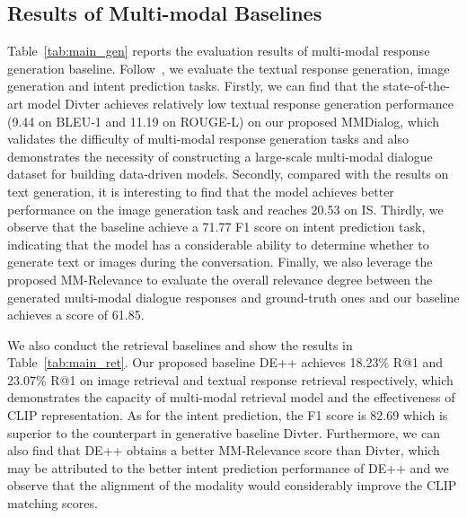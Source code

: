 \documentclass[11pt]{article}
\newcommand{\DataName}{MMDialog}
\begin{document}
\subsection{Results of Multi-modal Baselines}
Table~\ref{tab:main_gen} reports the evaluation results of multi-modal response generation baseline. Follow~\citet{sun-etal-2022-multimodal}, we evaluate the textual response generation, image generation and intent prediction tasks. Firstly, we can find that the state-of-the-art model Divter achieves relatively low textual response generation performance (9.44 on BLEU-1 and 11.19 on ROUGE-L) on our proposed \DataName, which validates the difficulty of multi-modal response generation tasks and also demonstrates the necessity of constructing a large-scale multi-modal dialogue dataset for building data-driven models. Secondly, compared with the results on text generation, it is interesting to find that the model achieves better performance on the image generation task and reaches 20.53 on IS. Thirdly, we observe that the baseline achieve a 71.77 F1 score on intent prediction task, indicating that the model has a considerable ability to determine whether to generate text or images during the conversation. Finally, we also leverage the proposed MM-Relevance to evaluate the overall relevance degree between the generated multi-modal dialogue responses and ground-truth ones and our baseline achieves a score of 61.85.

We also conduct the retrieval baselines and show the results in Table~\ref{tab:main_ret}. Our proposed baseline DE++ achieves 18.23\% R@1 and 23.07\% R@1 on image retrieval and textual response retrieval respectively, which demonstrates the capacity of multi-modal retrieval model and the effectiveness of CLIP representation. As for the intent prediction, the F1 score is 82.69 which is superior to the counterpart in generative baseline Divter. Furthermore, we can also find that DE++ obtains a better MM-Relevance score than Divter, which may be attributed to the better intent prediction performance of DE++ and we observe that the alignment of the modality would considerably improve the CLIP matching scores.
\end{document}
